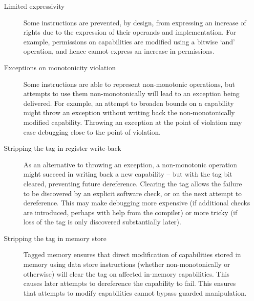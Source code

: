\begin{description}
\item[Limited expressivity] Some instructions are prevented, by design, from
  expressing an increase of rights due to the expression of their operands and
  implementation.
  For example, permissions on capabilities are modified using a bitwise `and'
  operation, and hence cannot express an increase in permissions.

\item[Exceptions on monotonicity violation] Some instructions are able to
  represent non-monotonic operations, but attempts to use them
  non-monotonically will lead to an exception being delivered.
  For example, an attempt to broaden bounds on a capability might throw an
  exception without writing back the non-monotonically modified capability.
  Throwing an exception at the point of violation may ease debugging close to
  the point of violation.

\item[Stripping the tag in register write-back] As an alternative to throwing
  an exception, a non-monotonic operation might succeed in writing back a new
  capability -- but with the tag bit cleared, preventing future dereference.
  Clearing the tag allows the failure to be discovered by an explicit
  software check, or on the next attempt to dereference.
  This may make debugging more expensive (if additional checks are introduced,
  perhaps with help from the compiler) or more tricky (if loss of the tag is
  only discovered substantially later).

\item[Stripping the tag in memory store] Tagged memory ensures that direct
  modification of capabilities stored in memory using data store instructions
  (whether non-monotonically or otherwise) will clear the tag on affected
  in-memory capabilities.
  This causes later attempts to dereference the capability to fail.
  This ensures that attempts to modify capabilities cannot bypass guarded
  manipulation.

\end{description}

